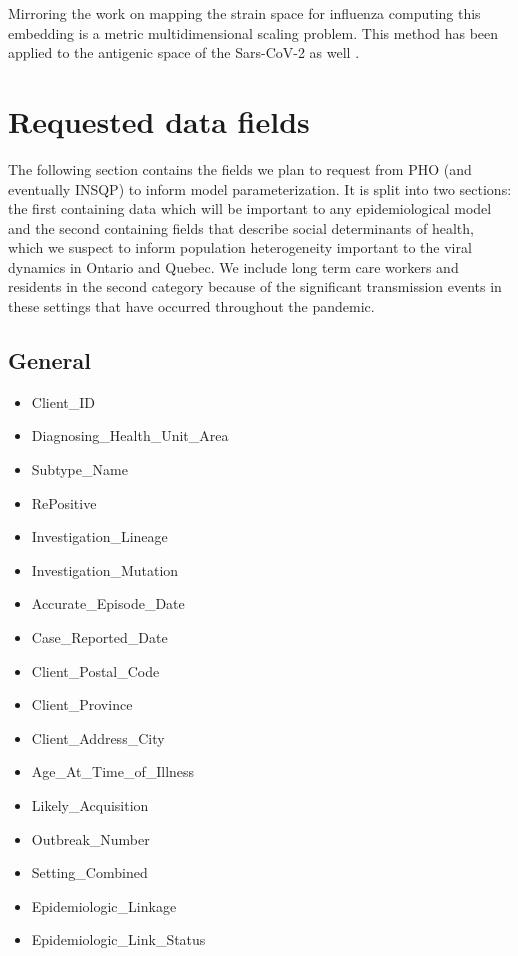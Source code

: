 \documentclass{article}
\begin{document}
Mirroring the work on mapping the strain space for influenza \cite{lapedesGeometryShapeSpace2001, smithMappingAntigenicGenetic2004, cai2010computational} computing this embedding is a metric multidimensional scaling problem. This method has been applied to the antigenic space of the Sars-CoV-2 as well \cite{millerAntigenicSpaceFramework2021, wilksMappingSARSCoV2Antigenic2022}. 

\newpage
\clearpage
\section{Requested data fields}
\label{data_fields}

The following section contains the fields we plan to request from PHO (and eventually INSQP) to inform model parameterization. It is split into two sections: the first containing data which will be important to any epidemiological model and the second containing fields that describe social determinants of health, which we suspect to inform population heterogeneity important to the viral dynamics in Ontario and Quebec. We include long term care workers and residents in the second category because of the significant transmission events in these settings that have occurred throughout the pandemic.

\subsection{General}
\begin{itemize}
    \item Client\_ID
    \item Diagnosing\_Health\_Unit\_Area
    \item Subtype\_Name
    \item RePositive
    \item Investigation\_Lineage
    \item Investigation\_Mutation
    \item Accurate\_Episode\_Date
    \item Case\_Reported\_Date
    \item Client\_Postal\_Code
    \item Client\_Province
    \item Client\_Address\_City
    \item Age\_At\_Time\_of\_Illness
    \item Likely\_Acquisition
    \item Outbreak\_Number
    \item Setting\_Combined
    \item Epidemiologic\_Linkage
    \item Epidemiologic\_Link\_Status
\end{itemize}
\end{document}
